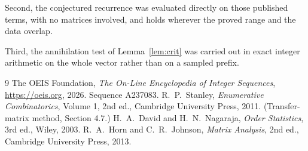\documentclass[11pt,a4paper]{article}
\theoremstyle{plain}
\theoremstyle{definition}
\begin{document}
Second, the conjectured recurrence was evaluated directly on those published terms, with no
matrices involved, and holds wherever the proved range and the data overlap.

Third, the annihilation test of Lemma~\ref{lem:crit} was carried out in exact integer
arithmetic on the whole vector rather than on a sampled prefix.

\begin{thebibliography}{9}
 The OEIS Foundation, \emph{The On-Line Encyclopedia of Integer
Sequences}, \url{https://oeis.org}, 2026. Sequence A237083.
 R.~P.~Stanley, \emph{Enumerative Combinatorics}, Volume 1, 2nd ed.,
Cambridge University Press, 2011. (Transfer-matrix method, Section 4.7.)
 H.~A.~David and H.~N.~Nagaraja, \emph{Order Statistics}, 3rd ed., Wiley,
2003.
 R.~A.~Horn and C.~R.~Johnson, \emph{Matrix Analysis}, 2nd ed., Cambridge
University Press, 2013.
\end{thebibliography}
\end{document}
